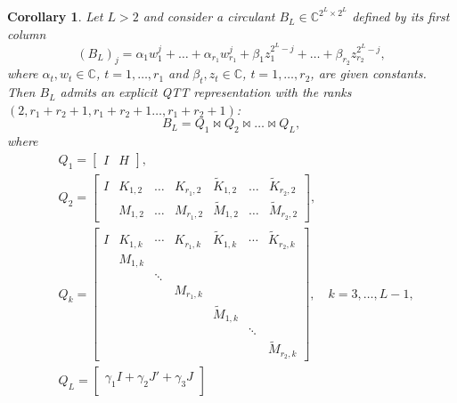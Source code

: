 \documentclass[a4paper]{article}
\newtheorem{corollary}{Corollary}[section]
\newcommand{\LL}{L}
\newcommand{\invA}{B}
\newcommand{\KK}{K}
\newcommand{\KKother}{\widetilde{K}}
\newcommand{\MM}{M}
\newcommand{\MMother}{\widetilde{M}}
\begin{document}
\begin{corollary} \label{prop:sum_z_stable}
    Let $\LL >2$ and consider a circulant $\invA_\LL \in \mathbb{C}^{2^\LL \times 2^\LL}$ defined by its first column
    \[
        (\invA_\LL)_j = \alpha_1 w_1^j + \dots + \alpha_{r_1} w_{r_1}^j + \beta_1 z_1^{2^{\LL}-j} + \dots + \beta_{r_2} z_{r_2}^{2^{\LL}-j},
    \]
    where $\alpha_t,w_t\in\mathbb{C}$, $t=1,\dots,r_1$ and $\beta_t,z_t\in\mathbb{C}$, $t=1,\dots,r_2$, are given constants.
    Then $\invA_\LL$ admits an explicit QTT representation with the ranks $(2,r_1+r_2+1,r_1 + r_2 +1\dots, r_1 + r_2 +1)$:
    \[
        \invA_\LL = Q_1 \Join Q_2\Join \dots \Join Q_\LL,
    \]
    where 
    \[
    \begin{split}
        &Q_1 = 
        \begin{bmatrix}
            I & H
        \end{bmatrix},
        \\
        &Q_2 = 
        \begin{bmatrix}
            I
            &
            \KK_{1,2} & \dots & \KK_{r_1,2} 
            &
            \KKother_{1,2} & \dots & \KKother_{r_2,2}
            \\
             &
             \MM_{1,2} & \dots & \MM_{r_1,2}
             &
             \MMother_{1,2} & \dots & \MMother_{r_2,2}
        \end{bmatrix},
        \\
    &Q_k = 
    \begin{bmatrix}
        I
        &
        \KK_{1,k} & \cdots & \KK_{r_1,k}
        &
        \KKother_{1,k} & \cdots & \KKother_{r_2,k}
        \\
         &
         \MM_{1,k} & & & & & \\
         & & \ddots  & & & \\
         & & & \MM_{r_1,k} & & & \\
         & & & & \MMother_{1,k} & & \\
         & & & & & \ddots & \\ 
         & & & & &        & \MMother_{r_2,k}
    \end{bmatrix}, 
    \quad k =3,\dots,\LL-1, \\
    &Q_\LL = 
    \begin{bmatrix}
        \gamma_1 I + \gamma_2 J' + \gamma_3 J \\

\end{bmatrix}
\end{split}\]
\end{corollary}
\end{document}
